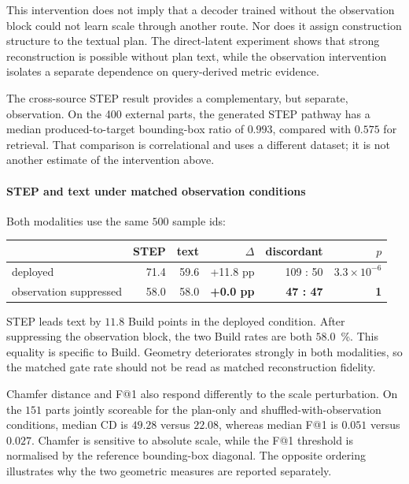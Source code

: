 \documentclass[preprint,12pt]{elsarticle}
\begin{document}
This intervention does not imply that a decoder trained without the observation block could
not learn scale through another route. Nor does it assign construction structure to the
textual plan. The direct-latent experiment shows that strong reconstruction is possible
without plan text, while the observation intervention isolates a separate dependence on
query-derived metric evidence.

The cross-source STEP result provides a complementary, but separate, observation. On the
400 external parts, the generated STEP pathway has a median produced-to-target bounding-box
ratio of $0.993$, compared with $0.575$ for retrieval. That comparison is correlational and
uses a different dataset; it is not another estimate of the intervention above.

\paragraph{STEP and text under matched observation conditions}
Both modalities use the same $500$ sample ids:

\begin{center}
  \footnotesize
  \begin{tabular}{lrrrrr}
    \toprule
                           & STEP & text & $\Delta$         & discordant       & $p$                \\
    \midrule
    deployed               & 71.4 & 59.6 & +11.8 pp         & 109 : 50         & $3.3\times10^{-6}$ \\
    observation suppressed & 58.0 & 58.0 & \textbf{+0.0 pp} & \textbf{47 : 47} & \textbf{1}         \\
    \bottomrule
  \end{tabular}
\end{center}

STEP leads text by $11.8$ Build points in the deployed condition. After suppressing the
observation block, the two Build rates are both $58.0$~\%. This equality is specific to
Build. Geometry deteriorates strongly in both modalities, so the matched gate rate should not
be read as matched reconstruction fidelity.

Chamfer distance and F@1 also respond differently to the scale perturbation. On the $151$
parts jointly scoreable for the plan-only and shuffled-with-observation conditions, median CD
is $49.28$ versus $22.08$, whereas median F@1 is $0.051$ versus $0.027$. Chamfer is sensitive
to absolute scale, while the F@1 threshold is normalised by the reference bounding-box
diagonal. The opposite ordering illustrates why the two geometric measures are reported
separately.
\end{document}
